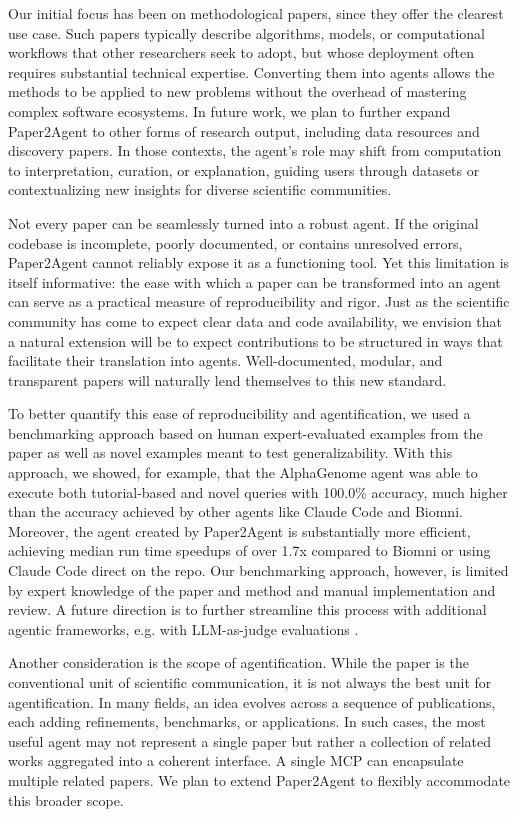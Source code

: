 \documentclass[11pt]{article}
\begin{document}
Our initial focus has been on methodological papers, since they offer the clearest use case. Such papers typically describe algorithms, models, or computational workflows that other researchers seek to adopt, but whose deployment often requires substantial technical expertise. Converting them into agents allows the methods to be applied to new problems without the overhead of mastering complex software ecosystems. In future work, we plan to further expand Paper2Agent to other forms of research output, including data resources and discovery papers. In those contexts, the agent’s role may shift from computation to interpretation, curation, or explanation, guiding users through datasets or contextualizing new insights for diverse scientific communities.

Not every paper can be seamlessly turned into a robust agent. If the original codebase is incomplete, poorly documented, or contains unresolved errors, Paper2Agent cannot reliably expose it as a functioning tool. Yet this limitation is itself informative: the ease with which a paper can be transformed into an agent can serve as a practical measure of reproducibility and rigor. Just as the scientific community has come to expect clear data and code availability, we envision that a natural extension will be to expect contributions to be structured in ways that facilitate their translation into agents. Well-documented, modular, and transparent papers will naturally lend themselves to this new standard.

To better quantify this ease of reproducibility and agentification, we used a benchmarking approach based on human expert-evaluated examples from the paper as well as novel examples meant to test generalizability. With this approach, we showed, for example, that the AlphaGenome agent was able to execute both tutorial-based and novel queries with 100.0\% accuracy, much higher than the accuracy achieved by other agents like Claude Code and Biomni. Moreover, the agent created by Paper2Agent is substantially more efficient, 
 achieving median run time speedups of  over 1.7x compared to Biomni or using Claude Code direct on the repo. Our benchmarking approach, however, is limited by expert knowledge of the paper and method and manual implementation and review. A future direction is to further streamline this process with additional agentic frameworks, e.g. with LLM-as-judge evaluations \citep{gu2024survey}.

Another consideration is the scope of agentification. While the paper is the conventional unit of scientific communication, it is not always the best unit for agentification. In many fields, an idea evolves across a sequence of publications, each adding refinements, benchmarks, or applications. In such cases, the most useful agent may not represent a single paper but rather a collection of related works aggregated into a coherent interface. A single MCP can encapsulate multiple related papers. We plan to extend Paper2Agent to flexibly accommodate this broader scope.
\end{document}
